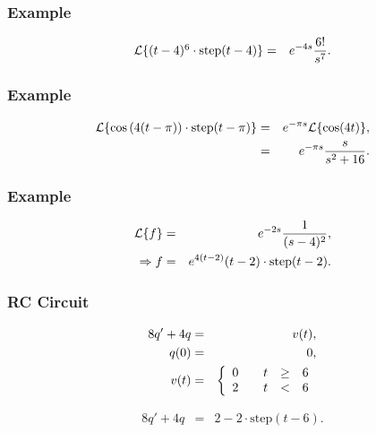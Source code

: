 \begin{frame}
  \frametitle{Example}

  \begin{eqnarray*}
    \laplace{(t-4)^6\cdot\mathrm{step}(t-4)} & = & e^{-4s}\frac{6!}{s^7}.
  \end{eqnarray*}


\end{frame}


\begin{frame}
  \frametitle{Example}

  \begin{eqnarray*}
    \laplace{\cos\lp 4(t-\pi)\rp\cdot\mathrm{step}(t-\pi)} & = & 
    e^{-\pi s}\laplace{\cos(4t)}, \\
    & = & e^{-\pi s} \frac{s}{s^2+16}.
  \end{eqnarray*}

\end{frame}



\begin{frame}
  \frametitle{Example}

  \begin{eqnarray*}
    \laplace{f} & = & e^{-2s}\frac{1}{(s-4)^2}, \\
    \Rightarrow f & = & e^{4(t-2)}(t-2) \cdot \mathrm{step}(t-2).
  \end{eqnarray*}

\end{frame}





\begin{frame}
  \frametitle{RC Circuit}

      


  \begin{eqnarray*}
    8q' + 4q & = & v(t), \\
    q(0) & = & 0, \\
    v(t) & = & 
    \left\{
      \begin{array}{r@{\hspace{2em}}rcl}
        0 & t & \geq & 6 \\
        2 & t & < & 6
      \end{array}
    \right.
  \end{eqnarray*}

  {
    \begin{eqnarray*}
      8q' + 4q & = & 2 - 2 \cdot \mathrm{step}(t-6).
    \end{eqnarray*}
        
  }

\end{frame}


